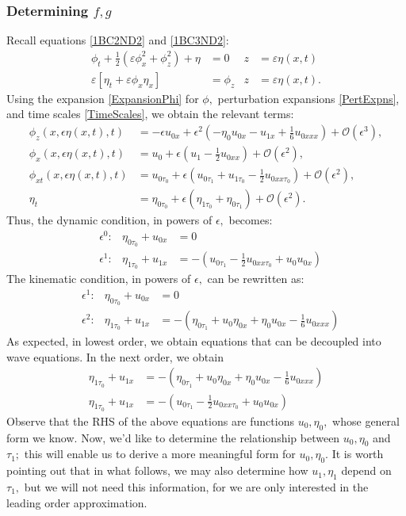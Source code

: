 \documentclass[10pt,reqno,oneside,a4paper]{article}
\begin{document}
\subsubsection*{Determining $f,g$}
Recall equations \eqref{1BC2ND2} and \eqref{1BC3ND2}:
\begin{align*}
\phi_{t} + \frac{1}{2} \left(\varepsilon\phi_{x}^2 + \phi_{z}^2\right) + \eta &= 0 &z &= \varepsilon\eta(x,t)\\
\varepsilon\left[\eta_{t} + \varepsilon \phi_{x} \eta_{x}\right] &= \phi_{z} &z &= \varepsilon\eta(x,t).
\end{align*}
Using the expansion \eqref{ExpansionPhi} for $\phi,$ perturbation expansions \eqref{PertExpns}, and time scales \eqref{TimeScales}, we obtain the relevant terms:
\begin{align*}
\phi_z(x, \epsilon \eta(x,t), t) &= -\epsilon u_{0x} + \epsilon^2 \left(-\eta_0 u_{0x} - u_{1x} + \frac{1}{6}u_{0xxx} \right) + \mathcal{O}(\epsilon^3), \\
\phi_x(x, \epsilon \eta(x,t), t) &= u_0 + \epsilon(u_1 - \frac{1}{2}u_{0xx}) + \mathcal{O}(\epsilon^2), \\
\phi_{xt}(x, \epsilon \eta(x,t), t) &=u_{0\tau_0} + \epsilon(u_{0\tau_1} + u_{1\tau_0} - \frac{1}{2}u_{0xx\tau_0})+ \mathcal{O}(\epsilon^2), \\
\eta_t &= \eta_{0\tau_0} + \epsilon(\eta_{1\tau_0} + \eta_{0\tau_1}) + \mathcal{O}(\epsilon^2).
\end{align*}
Thus, the dynamic condition, in powers of $\epsilon,$ becomes: 
\begin{align*}
&\epsilon^0: &\eta_{0\tau_0} + u_{0x} &= 0 \\
&\epsilon^1: &\eta_{1\tau_0} + u_{1x} &= - (u_{0\tau_1} -\frac{1}{2} u_{0xx\tau_0} + u_0 u_{0x}) 
\end{align*}
The kinematic condition, in powers of $\epsilon,$ can be rewritten as:
\begin{align*}
&\epsilon^1: &\eta_{0\tau_0} + u_{0x} &= 0 \\
&\epsilon^2: &\eta_{1\tau_0} + u_{1x} &= - (\eta_{0\tau_1} + u_0 \eta_{0x} + \eta_0 u_{0x} - \frac{1}{6}u_{0xxx})
\end{align*}
As expected, in lowest order, we obtain equations that can be decoupled into wave equations. In the next order, we obtain
\begin{equation}\label{2ndOrdP}
\begin{aligned}
\eta_{1\tau_0} + u_{1x} &= - (\eta_{0\tau_1} + u_0 \eta_{0x} + \eta_0 u_{0x} - \frac{1}{6}u_{0xxx}) \\
\eta_{1\tau_0} + u_{1x} &= - (u_{0\tau_1} -\frac{1}{2} u_{0xx\tau_0} + u_0 u_{0x}) 
\end{aligned}
\end{equation}
Observe that the RHS of the above equations are functions $u_0, \eta_0,$ whose general form we know. Now, we'd like to determine the relationship between $u_0, \eta_0$ and $\tau_1;$ this will enable us to derive a more meaningful form for $u_0, \eta_0.$ It is worth pointing out that in what follows, we may also determine how $u_1, \eta_1$ depend on $\tau_1,$ but we will not need this information, for we are only interested in the leading order approximation.
\end{document}
